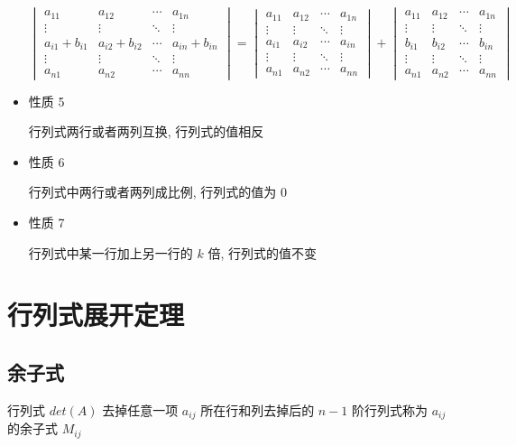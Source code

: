 \begin{corollary}[行列式的性质]
\begin{itemize}
		$$\begin{vmatrix}
			a_{11}          & a_{12}          & \cdots & a_{1n} \\
			\vdots          & \vdots          & \ddots & \vdots \\
			a_{i1} + b_{i1} & a_{i2} + b_{i2} & \cdots & a_{in} + b_{in} \\
			\vdots          & \vdots          & \ddots & \vdots \\
			a_{n1}          & a_{n2}          & \cdots & a_{nn}
		\end{vmatrix} = 
		\begin{vmatrix}
			a_{11} & a_{12} & \cdots & a_{1n}\\
			\vdots & \vdots & \ddots & \vdots\\
			a_{i1} & a_{i2} & \cdots & a_{in}\\
			\vdots & \vdots & \ddots & \vdots\\
			a_{n1} & a_{n2} & \cdots & a_{nn}
		\end{vmatrix} + 
		\begin{vmatrix}
			a_{11} & a_{12} & \cdots & a_{1n}\\
			\vdots & \vdots & \ddots & \vdots\\
			b_{i1} & b_{i2} & \cdots & b_{in}\\
			\vdots & \vdots & \ddots & \vdots\\
			a_{n1} & a_{n2} & \cdots & a_{nn}
		\end{vmatrix}$$

		\item \textcolor{purplea}{性质 5}
		
		行列式两行或者两列互换, 行列式的值相反

		\item \textcolor{purplea}{性质 6}
		
		行列式中两行或者两列成比例, 行列式的值为 $0$

		\item \textcolor{purplea}{性质 7}
		
		行列式中某一行加上另一行的 $k$ 倍, 行列式的值不变
	\end{itemize} 
\end{corollary}

\section{行列式展开定理}
\subsection{余子式}
\begin{definition}[余子式]
	行列式 $det(A)$ 去掉任意一项 $a_{ij}$ 所在行和列去掉后的 $n-1$ 阶行列式称为 $a_{ij}$ 的余子式 $M_{ij}$
\end{definition}


